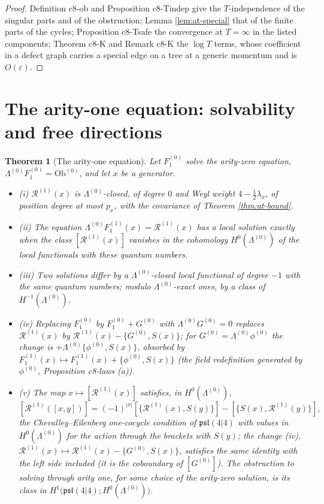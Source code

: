 \documentclass[11pt]{article}
\numberwithin{equation}{section}
\theoremstyle{plain}
\newtheorem{theorem}{Theorem}[section]
\theoremstyle{definition}
\newcommand{\Ob}{\mathrm{Ob}}
\begin{document}
\begin{proof}
Definition c8-ob and Proposition c8-Tindep give the $T$-independence of the singular parts and of the obstruction; Lemma \ref{lem:at-special} that of the finite parts of the cycles; Proposition c8-Tsafe the convergence at $T=\infty$ in the listed components; Theorem c8-K and Remark c8-K the $\log T$ terms, whose coefficient in a defect graph carries a special edge on a tree at a generic momentum and is $O(\varepsilon)$.
\end{proof}

\section{The arity-one equation: solvability and free directions}
\label{sec:at-eq1}

\begin{theorem}[The arity-one equation]
\label{thm:at-eq1}
Let $F_1^{(0)}$ solve the arity-zero equation, $\Lambda^{(0)}F_1^{(0)}=\Ob^{(0)}$, and let $x$ be a generator.
\begin{itemize}
\item (i) $\mathcal R^{(1)}(x)$ is $\Lambda^{(0)}$-closed, of degree $0$ and Weyl weight $4-\tfrac12\lambda_x$, of position degree at most $p_x$, with the covariance of Theorem \ref{thm:at-bound}.
\item (ii) The equation $\Lambda^{(0)}F_1^{(1)}(x)=\mathcal R^{(1)}(x)$ has a local solution exactly when the class $[\mathcal R^{(1)}(x)]$ vanishes in the cohomology $H^0(\Lambda^{(0)})$ of the local functionals with these quantum numbers.
\item (iii) Two solutions differ by a $\Lambda^{(0)}$-closed local functional of degree $-1$ with the same quantum numbers; modulo $\Lambda^{(0)}$-exact ones, by a class of $H^{-1}(\Lambda^{(0)})$.
\item (iv) Replacing $F_1^{(0)}$ by $F_1^{(0)}+G^{(0)}$ with $\Lambda^{(0)}G^{(0)}=0$ replaces $\mathcal R^{(1)}(x)$ by $\mathcal R^{(1)}(x)-\{G^{(0)},S(x)\}$; for $G^{(0)}=\Lambda^{(0)}\phi^{(0)}$ the change is $+\Lambda^{(0)}\{\phi^{(0)},S(x)\}$, absorbed by $F_1^{(1)}(x)\mapsto F_1^{(1)}(x)+\{\phi^{(0)},S(x)\}$ (the field redefinition generated by $\phi^{(0)}$, Proposition c8-laws (a)).
\item (v) The map $x\mapsto[\mathcal R^{(1)}(x)]$ satisfies, in $H^0(\Lambda^{(0)})$,
\[
[\mathcal R^{(1)}([x,y])]=(-1)^{|x|}[\{\mathcal R^{(1)}(x),S(y)\}]-[\{S(x),\mathcal R^{(1)}(y)\}],
\]
the Chevalley--Eilenberg one-cocycle condition of $\mathfrak{psl}(4|4)$ with values in $H^0(\Lambda^{(0)})$ for the action through the brackets with $S(y)$; the change (iv), $\mathcal R^{(1)}(x)\mapsto\mathcal R^{(1)}(x)-\{G^{(0)},S(x)\}$, satisfies the same identity with the left side included (it is the coboundary of $[G^{(0)}]$). The obstruction to solving through arity one, for some choice of the arity-zero solution, is its class in $H^1\big(\mathfrak{psl}(4|4);H^0(\Lambda^{(0)})\big)$.
\end{itemize}
\end{theorem}
\end{document}
